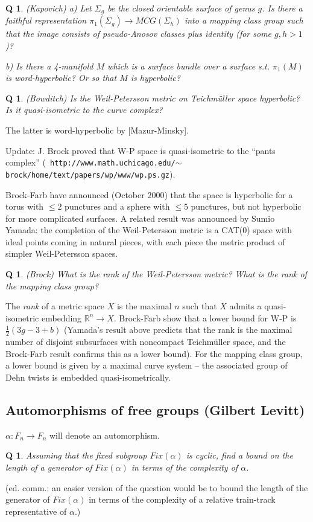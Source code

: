 \documentclass[11pt]{article}
\newtheorem{q}[thm]{Q}
\theoremstyle{remark}
\def\b{\begin{q}}
\def\e{\end{q}}
\def\R{{\mathbb R}}
\newcommand{\<}{\langle}
\renewcommand{\>}{\rangle}
\begin{document}
\b
(Kapovich) a) Let $\Sigma_g$ be the closed orientable surface of
genus $g$. Is there a faithful representation $\pi_1(\Sigma_g)\to
MCG(\Sigma_h)$ into a mapping class group such that the image consists
of pseudo-Anosov classes plus identity (for some $g,h>1$)?

b) Is there a 4-manifold $M$ which is a surface bundle over a surface
s.t.  $\pi_1(M)$ is word-hyperbolic? Or so that $M$ is hyperbolic?\e
                                                                       
\b
(Bowditch) Is the Weil-Petersson metric on Teichm\" uller space
hyperbolic?  Is it quasi-isometric to the curve complex? \e
The latter is
word-hyperbolic by [Mazur-Minsky]. 

Update: J. Brock proved that W-P space is quasi-isometric to the
``pants complex'' ({\tt
http://www.math.uchicago.edu/$\sim$brock/home/text/papers/wp/www/wp.ps.gz}).

Brock-Farb have announced (October 2000) that the space is
hyperbolic for a torus with $\leq 2$ punctures and a sphere with $\leq
5$ punctures, but not hyperbolic for more complicated surfaces. A
related result was announced by Sumio Yamada: the completion of the
Weil-Petersson metric is a CAT(0) space with ideal points coming in
natural pieces, with each piece the metric product of simpler
Weil-Petersson spaces.

\b
(Brock) What is the rank of the Weil-Petersson metric? What is the
rank of the mapping class group?
\e

The {\it rank} of a metric space $X$ is the maximal $n$ such that $X$
admits a quasi-isometric embedding $\R^n\to X$. Brock-Farb show that a
lower bound for W-P is $\frac 12 (3g-3+b)$ (Yamada's result above predicts
that the rank is the maximal number of disjoint subsurfaces with
noncompact Teichm\" uller space, and the Brock-Farb result confirms
this as a lower bound). For the mapping class group, a lower bound is
given by a maximal curve system -- the associated group of Dehn twists
is embedded quasi-isometrically.
                                                                      

\subsection{Automorphisms of free groups (Gilbert Levitt)}
$\alpha:F_n\to F_n$ will denote an automorphism. 

\b
Assuming that the fixed subgroup $Fix(\alpha)$ is cyclic, find a bound on
the length of a generator of $Fix(\alpha)$ in terms of the complexity of
$\alpha$. \e
(ed. comm.: an easier version of the question would be to bound the
length of the generator of $Fix(\alpha)$ in terms of the complexity of a
relative train-track representative of $\alpha$.)
\end{document}
